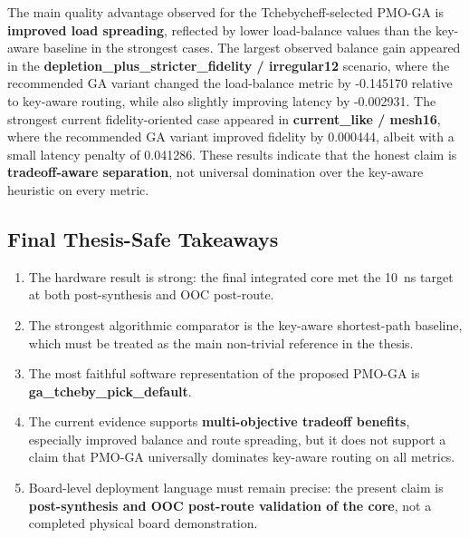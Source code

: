 The main quality advantage observed for the Tchebycheff-selected PMO-GA is \textbf{improved load spreading}, reflected by lower load-balance values than the key-aware baseline in the strongest cases. The largest observed balance gain appeared in the \textbf{depletion\_plus\_stricter\_fidelity / irregular12} scenario, where the recommended GA variant changed the load-balance metric by -0.145170 relative to key-aware routing, while also slightly improving latency by -0.002931. The strongest current fidelity-oriented case appeared in \textbf{current\_like / mesh16}, where the recommended GA variant improved fidelity by 0.000444, albeit with a small latency penalty of 0.041286. These results indicate that the honest claim is \textbf{tradeoff-aware separation}, not universal domination over the key-aware heuristic on every metric.

\subsection{Final Thesis-Safe Takeaways}

\begin{enumerate}
\item The hardware result is strong: the final integrated core met the 10~ns target at both post-synthesis and OOC post-route.
\item The strongest algorithmic comparator is the key-aware shortest-path baseline, which must be treated as the main non-trivial reference in the thesis.
\item The most faithful software representation of the proposed PMO-GA is \textbf{ga\_tcheby\_pick\_default}.
\item The current evidence supports \textbf{multi-objective tradeoff benefits}, especially improved balance and route spreading, but it does not support a claim that PMO-GA universally dominates key-aware routing on all metrics.
\item Board-level deployment language must remain precise: the present claim is \textbf{post-synthesis and OOC post-route validation of the core}, not a completed physical board demonstration.
\end{enumerate}
